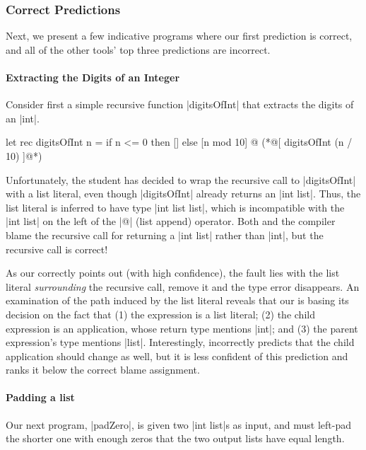 \subsubsection{Correct Predictions}
\label{sec:correct-predictions}
Next, we present a few indicative programs where our first prediction is
correct, and all of the other tools' top three predictions are
incorrect.

\paragraph{Extracting the Digits of an Integer}
Consider first a simple recursive function |digitsOfInt| that extracts
the digits of an |int|.
%
\begin{ecode}
  let rec digitsOfInt n =
    if n <= 0 then
      []
    else
      [n mod 10] @ (*@\colorbox{tree!75}{[ \colorbox{sherrloc!75}{digitsOfInt (n / 10)} ]}@*)
\end{ecode}
%
Unfortunately, the student has decided to wrap the recursive call to
|digitsOfInt| with a list literal, even though |digitsOfInt| already
returns an |int list|.
%
Thus, the list literal is inferred to have type |int list list|, which
is incompatible with the |int list| on the left of the |@| (list append)
operator.
%
Both \sherrloc and the \ocaml compiler blame the recursive call for
returning a |int list| rather than |int|, but the recursive call is
correct!

As our \dectree correctly points out (with high confidence), the fault
lies with the list literal \emph{surrounding} the recursive call, remove
it and the type error disappears.
%
An examination of the path induced by the list literal reveals that our
\dectree is basing its decision on the fact that
%
(1) the expression is a list literal;
%
(2) the child expression is an application, whose return type mentions |int|; and
%
(3) the parent expression's type mentions |list|.
%
Interestingly, \dectree incorrectly predicts that the child application
should change as well, but it is less confident of this prediction and
ranks it below the correct blame assignment.

\paragraph{Padding a list}
Our next program, |padZero|, is given two |int list|s as input, and must
left-pad the shorter one with enough zeros that the two output lists
have equal length.

